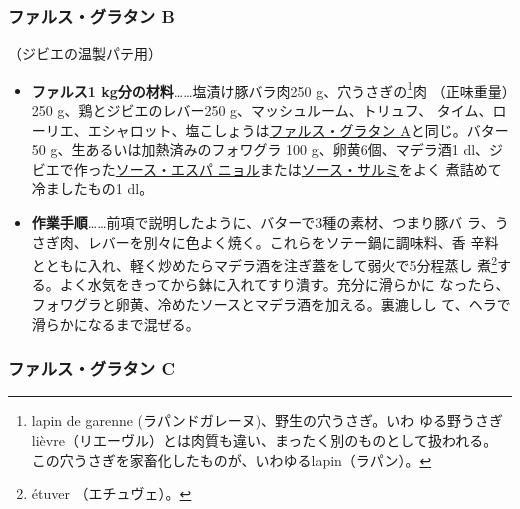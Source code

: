 \begin{recette}
\maeaki

\hypertarget{farce-gratin-b}{%
\subsubsection{ファルス・グラタン B}\label{farce-gratin-b}}


（ジビエの温製パテ用）


\begin{itemize}
\item
  \textbf{ファルス1 kg分の材料}\ldots{}\ldots{}塩漬け豚バラ肉250
  g、穴うさぎの\footnote{lapin de garenne
    (ラパンドガレーヌ)、野生の穴うさぎ。いわ
    ゆる野うさぎlièvre（リエーヴル）とは肉質も違い、まったく別のものとして扱われる。
    この穴うさぎを家畜化したものが、いわゆるlapin（ラパン）。}肉
  （正味重量）250 g、鶏とジビエのレバー250 g、マッシュルーム、トリュフ、
  タイム、ローリエ、エシャロット、塩こしょうは\protect\hyperlink{farce-gratin-a}{ファルス・グラタン
  A}と同じ。バター50 g、生あるいは加熱済みのフォワグラ 100
  g、卵黄6個、マデラ酒1\undemi{}
  dl、ジビエで作った\protect\hyperlink{sauce-espagnole}{ソース・エスパ
  ニョル}または\protect\hyperlink{sauce-salmis}{ソース・サルミ}をよく
  煮詰めて冷ましたもの1\undemi{} dl。
\item
  \textbf{作業手順}\ldots{}\ldots{}前項で説明したように、バターで3種の素材、つまり豚バ
  ラ、うさぎ肉、レバーを別々に色よく焼く。これらをソテー鍋に調味料、香
  辛料とともに入れ、軽く炒めたらマデラ酒を注ぎ蓋をして弱火で5分程蒸し
  煮\footnote{étuver （エチュヴェ）。}する。よく水気をきってから鉢に入れてすり潰す。充分に滑らかに
  なったら、フォワグラと卵黄、冷めたソースとマデラ酒を加える。裏漉しし
  て、ヘラで滑らかになるまで混ぜる。
\end{itemize}

\maeaki

\hypertarget{farce-gratin-c}{%
\subsubsection{ファルス・グラタン C}\label{farce-gratin-c}}




\end{recette}
